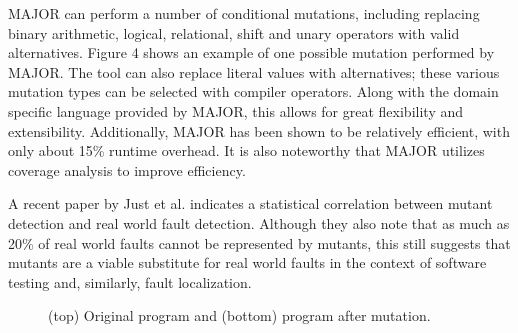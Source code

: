 MAJOR can perform a number of conditional mutations, including replacing
binary arithmetic, logical, relational, shift and unary operators with
valid alternatives.  Figure 4 shows an example of one
possible mutation performed by MAJOR.  The tool can also replace literal
values with alternatives; these various mutation types can be selected
with compiler operators.  Along with the domain specific language
provided by MAJOR, this allows for great flexibility and extensibility.
Additionally, MAJOR has been shown to be relatively efficient, with only
about 15\% runtime overhead.  It is also noteworthy that MAJOR utilizes
coverage analysis to improve efficiency.

A recent paper by Just et al. \cite{mutants} indicates a statistical
correlation between mutant detection and real world fault detection.
Although they also note that as much as 20\% of real world faults cannot
be represented by mutants, this still suggests that mutants are a viable
substitute for real world faults in the context of software testing and,
similarly, fault localization.

\begin{figure}[tbp]
  \centering
  
  
  \caption{(top) Original program and (bottom) program after mutation.}
  \label{majorex}
\end{figure}